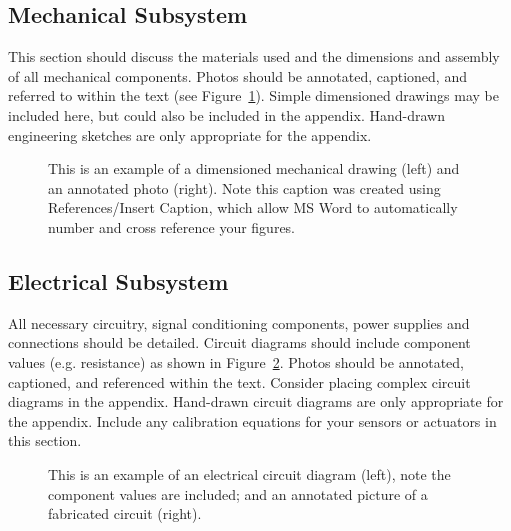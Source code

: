 \documentclass{wrcecapstone}
\begin{document}
\subsection{Mechanical Subsystem}
This section should discuss the materials used and the dimensions and assembly of all mechanical components. Photos should be annotated, captioned, and referred to within the text (see Figure~\ref{f1}). Simple dimensioned drawings may be included here, but could also be included in the appendix. Hand-drawn engineering sketches are only appropriate for the appendix.
\begin{figure}
\caption{This is an example of a dimensioned mechanical drawing (left) and an annotated photo (right).   Note this caption was created using References/Insert Caption, which allow MS Word to automatically number and cross reference your figures.}
\label{f1}
\end{figure}

\subsection{Electrical Subsystem}
All necessary circuitry, signal conditioning components, power supplies and connections should be detailed.  Circuit diagrams should include component values (e.g. resistance) as shown in Figure~\ref{f2}. Photos should be annotated, captioned, and referenced within the text. Consider placing complex circuit diagrams in the appendix. Hand-drawn circuit diagrams are only appropriate for the appendix.   Include any calibration equations for your sensors or actuators in this section. 
\begin{figure}
\caption{This is an example of an electrical circuit diagram (left), note the component values are included; and an annotated picture of a fabricated circuit (right).}
\label{f2}
\end{figure}
\end{document}
